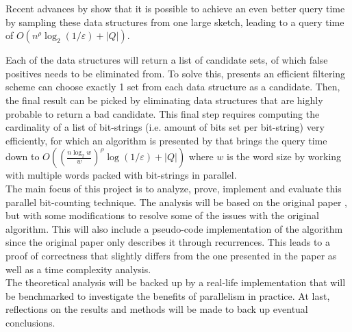 Recent advances by \citet{fast-similarity-search} show that it is possible to achieve an even better query time by sampling these data structures from one large sketch, leading to a query time of $O(n^\rho \log_2{(1/\varepsilon)} + |Q|)$.

Each of the data structures will return a list of candidate sets, of which false positives needs to be eliminated from. To solve this, \citet{fast-similarity-search} presents an efficient filtering scheme can choose exactly 1 set from each data structure as a candidate. Then, the final result can be picked by eliminating data structures that are highly probable to return a bad candidate. This final step requires computing the cardinality of a list of bit-strings (i.e. amount of bits set per bit-string) very efficiently, for which an algorithm is presented by \citet{fast-similarity-search} that brings the query time down to $O((\frac{n\log_2 w}{w})^\rho \log(1/\varepsilon) + |Q|)$ where $w$ is the word size by working with multiple words packed with bit-strings in parallel.\\
The main focus of this project is to analyze, prove, implement and evaluate this parallel bit-counting technique. The analysis will be based on the original paper \cite{fast-similarity-search}, but with some modifications to resolve some of the issues with the original algorithm. This will also include a pseudo-code implementation of the algorithm since the original paper only describes it through recurrences. This leads to a proof of correctness that slightly differs from the one presented in the paper as well as a time complexity analysis.\\
The theoretical analysis will be backed up by a real-life implementation that will be benchmarked to investigate the benefits of parallelism in practice. At last, reflections on the results and methods will be made to back up eventual conclusions.

